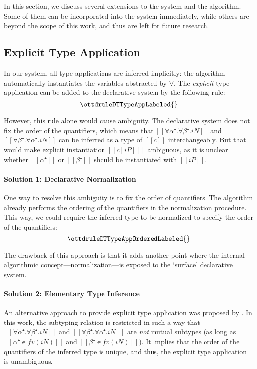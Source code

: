 \label{sec:extensions}

In this section, we discuss several extensions to the system and the algorithm.
Some of them can be incorporated into the system immediately, while others
are beyond the scope of this work, and thus are left for future research.

\subsection{Explicit Type Application}
\label{sec:explicit-type-application}

In our system, all type applications are inferred implicitly: the algorithm
automatically instantiates the variables abstracted by $\forall$. 
The \emph{explicit} type application can be added to the declarative system by the following rule:
$$\ottdruleDTTypeAppLabeled{}$$

However, this rule alone would cause ambiguity. The declarative system does not
fix the order of the quantifiers, which means that $[[∀α⁺.∀β⁺.iN]]$ and
$[[∀β⁺.∀α⁺.iN]]$ can be inferred as a type of $[[c]]$ interchangeably. But that
would make explicit instantiation $[[ c[iP] ]]$ ambiguous, as it is unclear
whether $[[α⁺]]$ or $[[β⁺]]$ should be instantiated with $[[iP]]$.

\paragraph{Solution 1: Declarative Normalization}
One way to resolve this ambiguity is to fix the order of quantifiers.  
The algorithm already performs the ordering of the quantifiers in the normalization procedure.
This way, we could require the inferred type to be normalized
to specify the order of the quantifiers:
$$\ottdruleDTTypeAppOrderedLabeled{}$$

The drawback of this approach is that it adds another point where the internal
algorithmic concept---normalization---is exposed to the `surface' declarative
system.

\paragraph{Solution 2: Elementary Type Inference}
An alternative approach to provide explicit type application
 was proposed by \cite{zhao22:elementary}.
In this work, the subtyping relation is restricted 
in such a way that 
$[[∀α⁺.∀β⁺.iN]]$ and $[[∀β⁺.∀α⁺.iN]]$ are \emph{not} mutual subtypes 
(as long as $[[α⁺ ∊ fv(iN)]]$ and $[[β⁺ ∊ fv(iN)]]$).
It implies that the order of the quantifiers of the inferred type is unique,
and thus, the explicit type application is unambiguous.

